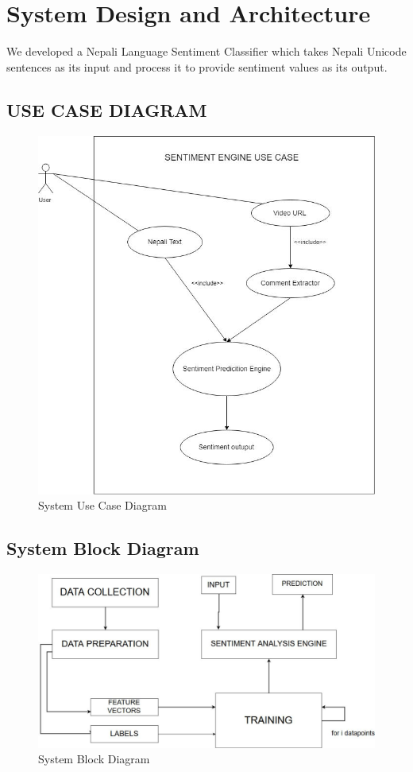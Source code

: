 	\chapter{System Design and Architecture}
	    We developed a Nepali Language Sentiment Classifier which takes Nepali Unicode
sentences as its input and process it to provide sentiment values as its output.
        \section{USE CASE DIAGRAM}
          \begin{figure}[h]
		    \centering
		      \includegraphics[width=.75\textwidth]{./img/5.1.jpg}
			    \caption{System Use Case Diagram}
		\end{figure}
		
        \section{System Block Diagram}
        	\begin{figure}[h]
		    \centering
			    \includegraphics[width=1.0\textwidth]{./img/5.2.jpg}
			    \caption{System Block Diagram}
		\end{figure}
        
